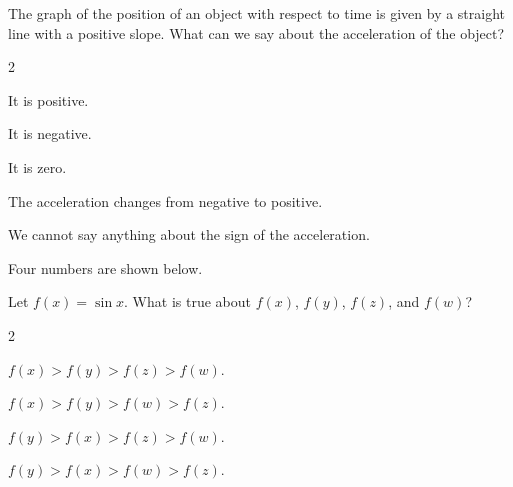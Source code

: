 \documentclass[12pt]{ximera}
\renewenvironment{multipleChoice}
{\begin{trivlist}\item[\hskip\labelsep\small\bfseries Choose the best answer:]
\hfil\begin{enumerate}\begin{multicols}{2}}
 {\end{multicols}\end{enumerate}\end{trivlist}}
\renewcommand{\choice}[2][]{\item \begin{minipage}[t]{2in}#2\end{minipage}\ifthenelse{\boolean{#1}}{\ifhandout \else  \fi}{}}
\begin{document}
\begin{minipage}{\textwidth}
\begin{problem}

  The graph of the position of an object with respect to time is given
  by a straight line with a positive slope.  What can we say about the
  acceleration of the object?
  \begin{multipleChoice}
    \choice{It is positive.}
    \choice{It is negative.}
    \choice[correct]{It is zero.}
    \choice{The acceleration changes from negative to positive.}
    \choice{We cannot say anything about the sign of the acceleration.}
  \end{multipleChoice}
\end{problem}
\end{minipage}

\vspace{6ex}

\begin{minipage}{\textwidth}
\begin{problem}

  Four numbers are shown below.
  \begin{image}
  \end{image}
  Let $f(x) = \sin x$.  What is true about $f(x)$, $f(y)$, $f(z)$, and $f(w)$?
  \begin{multipleChoice}
    \choice{$f(x) > f(y) > f(z) > f(w)$.}
    \choice{$f(x) > f(y) > f(w) > f(z)$.}
    \choice[correct]{$f(y) > f(x) > f(z) > f(w)$.}
    \choice{$f(y) > f(x) > f(w) > f(z)$.}
  \end{multipleChoice}
\end{problem}
\end{minipage}

\vspace{6ex}
\end{document}
